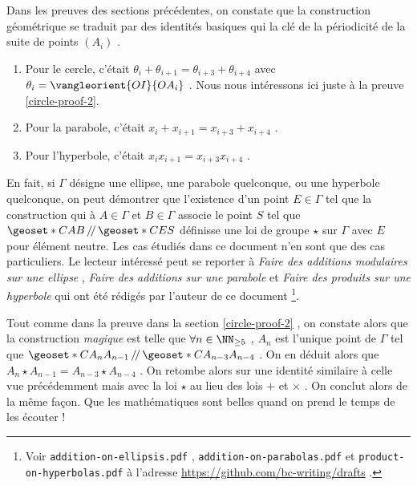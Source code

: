 Dans les preuves des sections précédentes, on constate que la construction géométrique se traduit par des identités basiques qui la clé de la périodicité de la suite de points $\left( A_i \right)$ . 
\begin{enumerate}
	\item Pour le cercle, c'était $\theta_i + \theta_{i+1} = \theta_{i+3} + \theta_{i+4}$ avec $\theta_i = \vangleorient{OI}{OA_i}$ . Nous nous intéressons ici juste à la preuve \ref{circle-proof-2}. 

	\item Pour la parabole, c'était $x_i + x_{i+1} = x_{i+3} + x_{i+4}$ . 

	\item Pour l'hyperbole, c'était  $x_i x_{i+1} = x_{i+3} x_{i+4}$ . 
\end{enumerate}


\medskip


En fait, si $\Gamma$ désigne une ellipse, une parabole quelconque, ou une hyperbole quelconque, on peut démontrer que l'existence d'un point $E \in \Gamma$ tel que la construction qui à $A \in \Gamma$ et $B \in \Gamma$ associe le point $S$ tel que $\geoset*{C}{AB} \,/\!/\, \geoset*{C}{ES}$ définisse une loi de groupe $\star$ sur $\Gamma$ avec $E$ pour élément neutre. 
Les cas étudiés dans ce document n'en sont que des cas particuliers. 
Le lecteur intéressé peut se reporter à  
\emph{\og Faire des additions modulaires sur une ellipse \fg} ,
\emph{\og Faire des additions sur une parabole \fg} 
et
\emph{\og Faire des produits sur une hyperbole \fg}
qui ont été rédigés par l'auteur de ce document
\footnote{
	Voir \texttt{addition-on-ellipsis.pdf} , \texttt{addition-on-parabolas.pdf}  et \texttt{product-on-hyperbolas.pdf}  à l'adresse \url{https://github.com/bc-writing/drafts} .
}.


\medskip


Tout comme dans la preuve dans la section \ref{circle-proof-2} , on constate alors que la construction \emph{\og magique \fg} est telle que $\forall n \in \NN_{\geq 5}$ , $A_{n}$ est l'unique point de $\Gamma$ tel que $\geoset*{C}{A_{n} A_{n-1}} \,/\!/\, \geoset*{C}{A_{n-3} A_{n-4}}$ . On en déduit alors que $A_{n} \star A_{n-1} = A_{n-3} \star A_{n-4}$ . On retombe alors sur une identité similaire à celle vue précédemment mais avec la loi $\star$ au lieu des lois $+$ et $\times$ . On conclut alors de la même façon. Que les mathématiques sont belles quand on prend le temps de les écouter !
